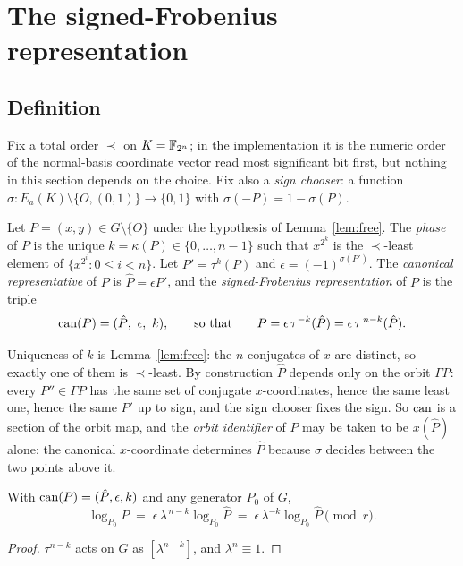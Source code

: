 \section{The signed-Frobenius representation}
\label{sec:representation}

\subsection{Definition}

Fix a total order $\prec$ on $K=\mathbb{F}_{2^n}$; in the implementation it is the
numeric order of the normal-basis coordinate vector read most
significant bit first, but nothing in this section depends on the
choice. Fix also a \emph{sign chooser}: a function
$\sigma:E_a(K)\setminus\{O,(0,1)\}\to\{0,1\}$ with
$\sigma(-P)=1-\sigma(P)$.

\begin{definition}
\label{def:sf}
Let $P=(x,y)\in G\setminus\{O\}$ under the hypothesis of
Lemma~\ref{lem:free}. The \emph{phase} of $P$ is the unique
$k=\kappa(P)\in\{0,\dots,n-1\}$ such that $x^{2^k}$ is the
$\prec$-least element of $\{x^{2^i}:0\le i<n\}$. Let
$P'=\tau^{k}(P)$ and $\epsilon=(-1)^{\sigma(P')}$. The \emph{canonical
representative} of $P$ is $\hat P=\epsilon P'$, and the
\emph{signed-Frobenius representation} of $P$ is the triple
\[
  \can(P)=(\hat P,\ \epsilon,\ k),\qquad\text{so that}\qquad
  P=\epsilon\,\tau^{-k}(\hat P)=\epsilon\,\tau^{\,n-k}(\hat P).
\]
\end{definition}

Uniqueness of $k$ is Lemma~\ref{lem:free}: the $n$ conjugates of $x$
are distinct, so exactly one of them is $\prec$-least. By construction
$\hat P$ depends only on the orbit $\Gamma P$: every $P''\in\Gamma P$
has the same set of conjugate $x$-coordinates, hence the same least
one, hence the same $P'$ up to sign, and the sign chooser fixes the
sign. So $\operatorname{can}$ is a section of the orbit map, and the \emph{orbit
identifier} of $P$ may be taken to be $x(\hat P)$ alone: the
canonical $x$-coordinate determines $\hat P$ because $\sigma$ decides
between the two points above it.

\begin{proposition}
\label{prop:transport}
With $\operatorname{can}(P)=(\hat P,\epsilon,k)$ and any generator $P_0$ of $G$,
\[
  \log_{P_0}P\;=\;\epsilon\,\lambda^{\,n-k}\log_{P_0}\hat P
  \;=\;\epsilon\,\lambda^{-k}\log_{P_0}\hat P\pmod r .
\]
\end{proposition}
\begin{proof}
$\tau^{n-k}$ acts on $G$ as $[\lambda^{n-k}]$, and
$\lambda^n\equiv1$.
\end{proof}

